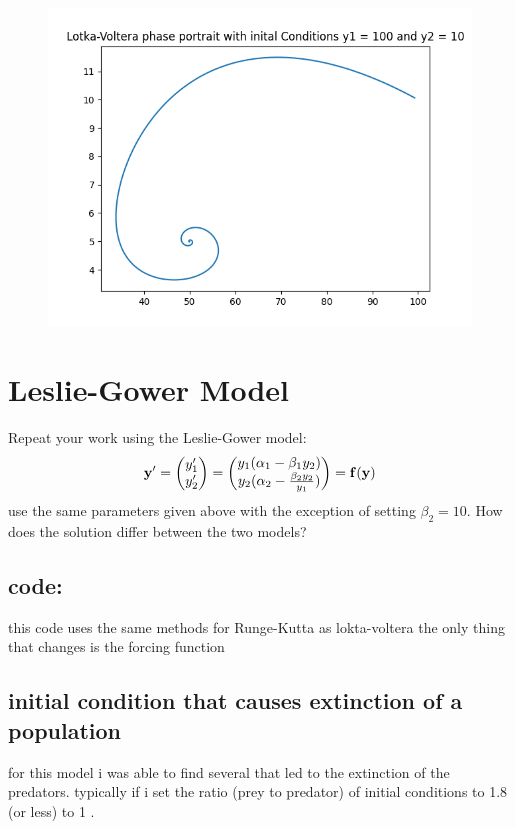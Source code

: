 \documentclass{article}
\begin{document}
\begin{figure}[hbt!]
	\centering
	\includegraphics[width=.75\linewidth]{LV_phase_portrait.png}
	
	\label{fig: Lotka voltera phase portrait}
\end{figure}

\pagebreak
\section{Leslie-Gower Model}
Repeat your work using the Leslie-Gower model:
$$
\bf{y}' =
\begin{pmatrix}
	y_1' \\ y_2'
\end{pmatrix} = 
\begin{pmatrix}
	y_1(\alpha_1-\beta_1y_2) \\ y_2(\alpha_2-\frac{\beta_2y_2}{y_1})
\end{pmatrix}
= \bf{f(y)}
$$
use the same parameters given above with the exception of setting $\beta_2 = 10$. How does
the solution differ between the two models?
\subsection{code:}
this code uses the same methods for Runge-Kutta as lokta-voltera the only thing that changes is the forcing function  

\subsection{initial condition that causes extinction of a population}
for this model i was able to find several that led to the extinction of the predators. typically if i set the ratio (prey to predator) of initial conditions to 1.8 (or less) to 1 . 
\end{document}

